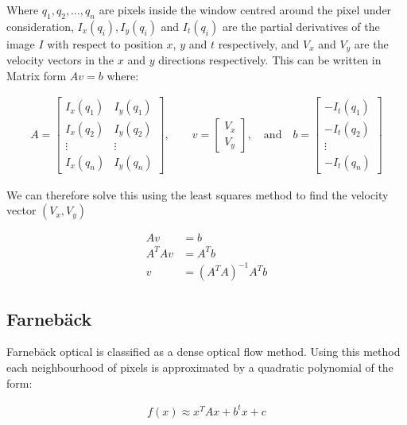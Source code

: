 \documentclass[a4paper,10pt]{article}
\begin{document}
      Where $q_1,q_2,\dots,q_n$ are pixels inside the window centred around the pixel under consideration, $I_x(q_i),I_y(q_i)$ and $I_t(q_i)$ are the partial derivatives of the image $I$ with respect to position $x$, $y$ and $t$ respectively, and $V_x$ and $V_y$ are the velocity vectors in the $x$ and $y$ directions respectively. This can be written in Matrix form $Av=b$ where:
      
      \begin{align*}
        A=\begin{bmatrix}
        I_x(q_1) & I_y(q_1) \\
        I_x(q_2) & I_y(q_2) \\
        \vdots  & \vdots  \\
        I_x(q_n) & I_y(q_n) 
        \end{bmatrix},
        \quad\quad
        v = 
        \begin{bmatrix}
        V_x\\
        V_y
        \end{bmatrix},
        \quad \mbox{and}\quad
        b = 
        \begin{bmatrix}
        -I_t(q_1) \\
        -I_t(q_2) \\
        \vdots  \\
        -I_t(q_n)
        \end{bmatrix} 
      \end{align*}
      
      We can therefore solve this using the least squares method to find the velocity vector $(V_x,V_y)$
      
      \begin{align*}
        Av &= b \\
        A^T A v &= A^T b \\
        v &= (A^T A)^{-1}A^T b
      \end{align*}
      
    \subsection{Farnebäck}
      Farnebäck optical is classified as a dense optical flow method. Using this method each neighbourhood of pixels is approximated by a quadratic polynomial of the form:
      
      \begin{align*}
        f(x) \approx x^TAx+b^tx+c
      \end{align*}
      
\end{document}
